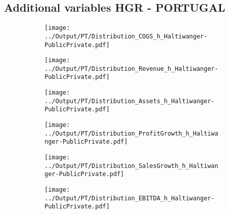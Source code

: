 \documentclass[12pt,notitlepage]{article}
\begin{document}
\subsection*{Additional variables HGR - PORTUGAL}
\begin{figure}[!htpb]
\centering
\begin{subfigure}{.49\textwidth}
    \centering
 \texttt{[image: ../Output/PT/Distribution\_COGS\_h\_Haltiwanger-PublicPrivate.pdf]}
\end{subfigure}%
\begin{subfigure}{.49\textwidth}
    \centering
 \texttt{[image: ../Output/PT/Distribution\_Revenue\_h\_Haltiwanger-PublicPrivate.pdf]}
\end{subfigure}
\begin{subfigure}{.49\textwidth}
    \centering
 \texttt{[image: ../Output/PT/Distribution\_Assets\_h\_Haltiwanger-PublicPrivate.pdf]}
\end{subfigure}%
\begin{subfigure}{.49\textwidth}
    \centering
 \texttt{[image: ../Output/PT/Distribution\_ProfitGrowth\_h\_Haltiwanger-PublicPrivate.pdf]}
\end{subfigure}
\begin{subfigure}{.49\textwidth}
    \centering
 \texttt{[image: ../Output/PT/Distribution\_SalesGrowth\_h\_Haltiwanger-PublicPrivate.pdf]}
\end{subfigure}
\begin{subfigure}{.49\textwidth}
    \centering
 \texttt{[image: ../Output/PT/Distribution\_EBITDA\_h\_Haltiwanger-PublicPrivate.pdf]}
\end{subfigure}
\end{figure}
\clearpage
\end{document}
